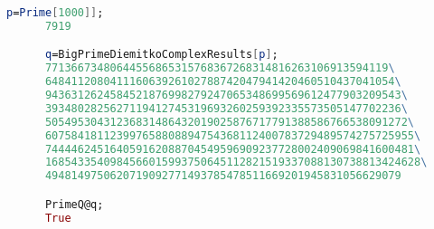       \begin{lstlisting}[language=Mathematica,caption={Пример 3}]
      p=Prime[1000]];
      7919

      q=BigPrimeDiemitkoComplexResults[p];
      77136673480644556865315768367268314816263106913594119\
      648411208041116063926102788742047941420460510437041054\
      9436312624584521876998279247065348699569612477903209543\
      3934802825627119412745319693260259392335573505147702236\
      50549530431236831486432019025876717791388586766538091272\
      607584181123997658808894754368112400783729489574275725955\
      744446245164059162088704549596909237728002409069841600481\
      1685433540984566015993750645112821519337088130738813424628\
      4948149750620719092771493785478511669201945831056629079

      PrimeQ@q;
      True
      \end{lstlisting}
